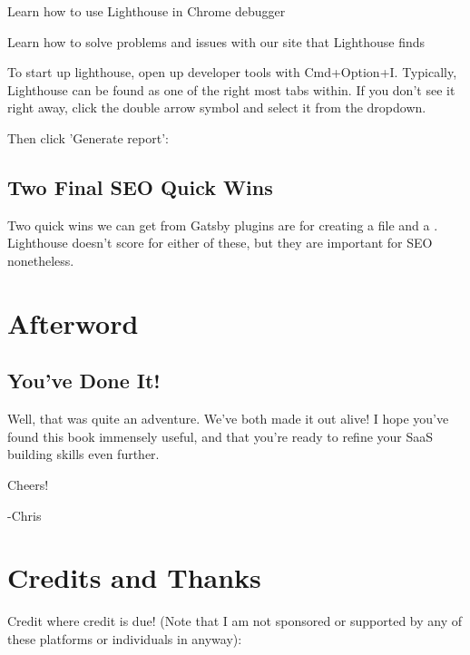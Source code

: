 \documentclass[paper=6in:9in,pagesize=pdftex,headinclude=on,footinclude=on,12pt]{scrbook}
\begin{document}
\begin{arrows}
\item Learn how to use Lighthouse in Chrome debugger
\item Learn how to solve problems and issues with our site that Lighthouse finds
\end{arrows}

To start up lighthouse, open up developer tools with Cmd+Option+I. Typically, Lighthouse can be found as one of the right most tabs within. If you don't see it right away, click the double arrow symbol and select it from the dropdown.

Then click 'Generate report':


\section{Two Final SEO Quick Wins}

Two quick wins we can get from Gatsby plugins are for creating a  file and a . Lighthouse doesn't score for either of these, but they are important for SEO nonetheless.

\chapter*{Afterword}

\section*{You've Done It!}

Well, that was quite an adventure. We've both made it out alive! I hope you've found this book immensely useful, and that you're ready to refine your SaaS building skills even further.

Cheers! \beers

-Chris

\chapter*{Credits and Thanks}

Credit where credit is due! (Note that I am not sponsored or supported by any of these platforms or individuals in anyway):
\end{document}
